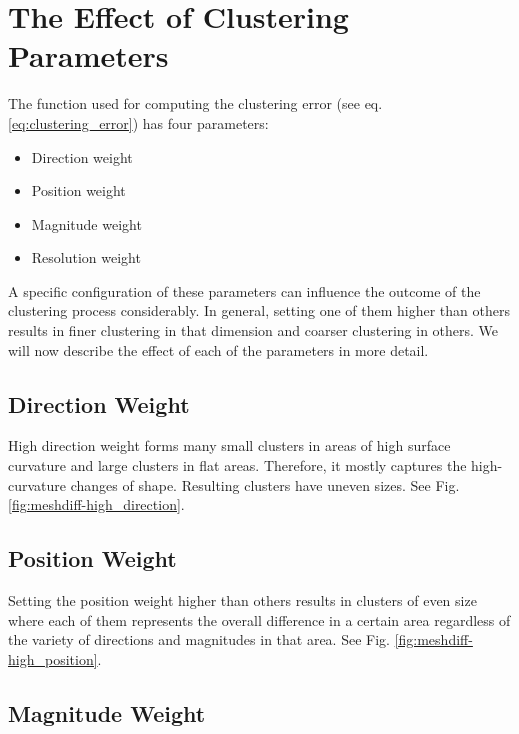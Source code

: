 \section{The Effect of Clustering Parameters}
\label{sec:analysis-parameter_effect}

The function used for computing the clustering error (see eq. \ref{eq:clustering_error}) has four parameters:

\begin{itemize}
\item Direction weight
\item Position weight
\item Magnitude weight
\item Resolution weight
\end{itemize}

A specific configuration of these parameters can influence the outcome of the clustering process considerably. In general, setting one of them higher than others results in finer clustering in that dimension and coarser clustering in others. We will now describe the effect of each of the parameters in more detail.

\subsection{Direction Weight}
\label{subsec:analysis-parameter_effect-direction}

High direction weight forms many small clusters in areas of high surface curvature and large clusters in flat areas. Therefore, it mostly captures the high-curvature changes of shape. Resulting clusters have uneven sizes. See Fig. \ref{fig:meshdiff-high_direction}.
\subsection{Position Weight}
\label{subsec:analysis-parameter_effect-position}

Setting the position weight higher than others results in clusters of even size where each of them represents the overall difference in a certain area regardless of the variety of directions and magnitudes in that area. See Fig. \ref{fig:meshdiff-high_position}.
\subsection{Magnitude Weight}
\label{subsec:analysis-parameter_effect-magnitude}

